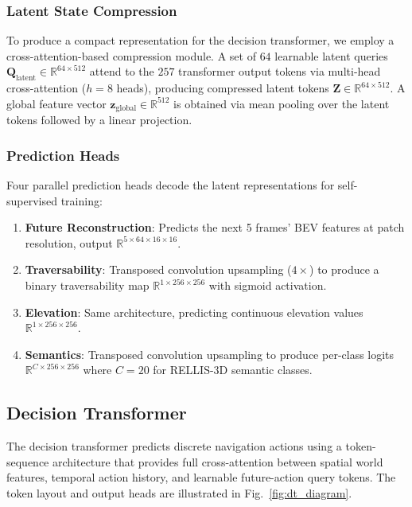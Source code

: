 \documentclass[sensors,article,submit,pdftex,moreauthors]{Definitions/mdpi}
\begin{document}
\subsubsection{Latent State Compression}
To produce a compact representation for the decision transformer, we employ a cross-attention-based compression module. A set of $64$ learnable latent queries $\mathbf{Q}_\text{latent} \in \mathbb{R}^{64 \times 512}$ attend to the $257$ transformer output tokens via multi-head cross-attention ($h = 8$ heads), producing compressed latent tokens $\mathbf{Z} \in \mathbb{R}^{64 \times 512}$. A global feature vector $\mathbf{z}_\text{global} \in \mathbb{R}^{512}$ is obtained via mean pooling over the latent tokens followed by a linear projection.

\subsubsection{Prediction Heads}
Four parallel prediction heads decode the latent representations for self-supervised training:

\begin{enumerate}
    \item \textbf{Future Reconstruction}: Predicts the next 5 frames' BEV features at patch resolution, output $\mathbb{R}^{5 \times 64 \times 16 \times 16}$.
    \item \textbf{Traversability}: Transposed convolution upsampling ($4\times$) to produce a binary traversability map $\mathbb{R}^{1 \times 256 \times 256}$ with sigmoid activation.
    \item \textbf{Elevation}: Same architecture, predicting continuous elevation values $\mathbb{R}^{1 \times 256 \times 256}$.
    \item \textbf{Semantics}: Transposed convolution upsampling to produce per-class logits $\mathbb{R}^{C \times 256 \times 256}$ where $C = 20$ for RELLIS-3D semantic classes.
\end{enumerate}

\subsection{Decision Transformer}
\label{sec:decision_transformer}

The decision transformer predicts discrete navigation actions using a token-sequence architecture that provides full cross-attention between spatial world features, temporal action history, and learnable future-action query tokens. The token layout and output heads are illustrated in Fig.~\ref{fig:dt_diagram}.
\end{document}
